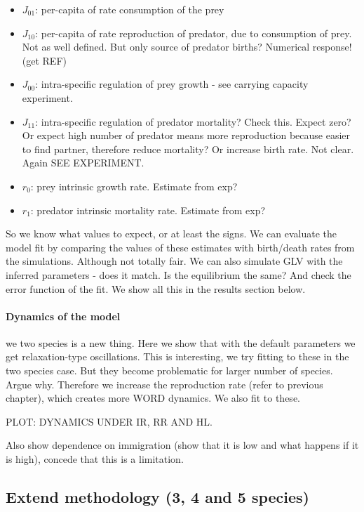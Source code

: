 \begin{itemize}
	\item $J_{01}$: per-capita of rate consumption of the prey
	\item $J_{10}$: per-capita of rate reproduction of predator, due to consumption of prey. Not as well defined. But only source of predator births? Numerical response! (get REF)
	
	\item $J_{00}$: intra-specific regulation of prey growth - see carrying capacity experiment.
	
	\item $J_{11}$: intra-specific regulation of predator mortality? Check this. Expect zero? Or expect high number of predator means more reproduction because easier to find partner, therefore reduce mortality? Or increase birth rate. Not clear. Again SEE EXPERIMENT. 
	
	\item $r_0$: prey intrinsic growth rate. Estimate from exp?
	
	\item $r_1$: predator intrinsic mortality rate. Estimate from exp?
\end{itemize}

So we know what values to expect, or at least the signs. We can evaluate the model fit by comparing the values of these estimates with birth/death rates from the simulations. Although not totally fair. We can also simulate GLV with the inferred parameters - does it match. Is the equilibrium the same? And check the error function of the fit. We show all this in the results section below.

\paragraph*{Dynamics of the model} we two species is a new thing. Here we show that with the default parameters we get relaxation-type oscillations. This is interesting, we try fitting to these in the two species case. But they become problematic for larger number of species. Argue why. Therefore we increase the reproduction rate (refer to previous chapter), which creates more WORD dynamics. We also fit to these. 

PLOT: DYNAMICS UNDER IR, RR AND HL.

Also show dependence on immigration (show that it is low and what happens if it is high), concede that this is a limitation. 

\subsection{Extend methodology (3, 4 and 5 species)}

